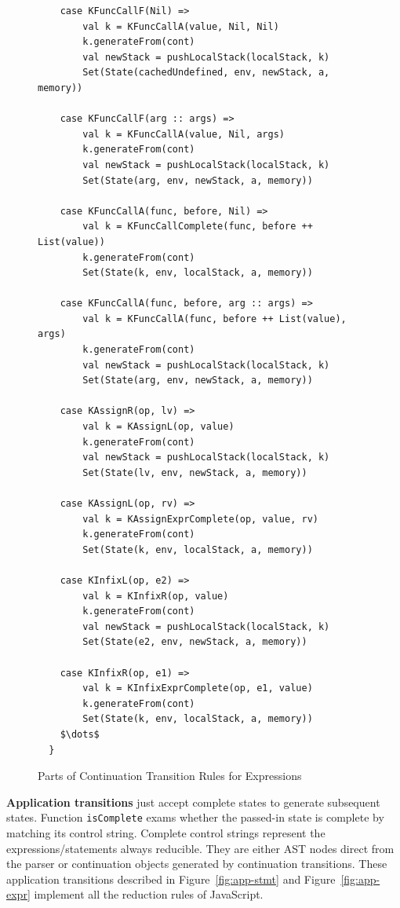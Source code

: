 \documentclass{article}
\begin{document}
\begin{figure}
\lstset{language=Scala, mathescape}
\begin{lstlisting}
    case KFuncCallF(Nil) =>
        val k = KFuncCallA(value, Nil, Nil)
        k.generateFrom(cont)
        val newStack = pushLocalStack(localStack, k)
        Set(State(cachedUndefined, env, newStack, a, memory))

    case KFuncCallF(arg :: args) =>
        val k = KFuncCallA(value, Nil, args)
        k.generateFrom(cont)
        val newStack = pushLocalStack(localStack, k)
        Set(State(arg, env, newStack, a, memory))

    case KFuncCallA(func, before, Nil) =>
        val k = KFuncCallComplete(func, before ++ List(value))
        k.generateFrom(cont)
        Set(State(k, env, localStack, a, memory))

    case KFuncCallA(func, before, arg :: args) =>
        val k = KFuncCallA(func, before ++ List(value), args)
        k.generateFrom(cont)
        val newStack = pushLocalStack(localStack, k)
        Set(State(arg, env, newStack, a, memory))

    case KAssignR(op, lv) =>
        val k = KAssignL(op, value)
        k.generateFrom(cont)
        val newStack = pushLocalStack(localStack, k)
        Set(State(lv, env, newStack, a, memory))

    case KAssignL(op, rv) =>
        val k = KAssignExprComplete(op, value, rv)
        k.generateFrom(cont)
        Set(State(k, env, localStack, a, memory))

    case KInfixL(op, e2) =>
        val k = KInfixR(op, value)
        k.generateFrom(cont)
        val newStack = pushLocalStack(localStack, k)
        Set(State(e2, env, newStack, a, memory))

    case KInfixR(op, e1) =>
        val k = KInfixExprComplete(op, e1, value)
        k.generateFrom(cont)
        Set(State(k, env, localStack, a, memory))
    $\dots$
  }
\end{lstlisting}
\caption{Parts of Continuation Transition Rules for Expressions}
\label{fig:cont-expr}
\end{figure}

\textbf{Application transitions} just accept complete states to generate subsequent states. Function \verb|isComplete| exams whether the passed-in state is complete by matching its control string.
Complete control strings represent the expressions/statements always reducible.
They are either AST nodes direct from the parser or continuation objects generated by continuation transitions. These application transitions described in Figure~\ref{fig:app-stmt} and Figure~\ref{fig:app-expr} implement all the reduction rules of JavaScript.
\end{document}
